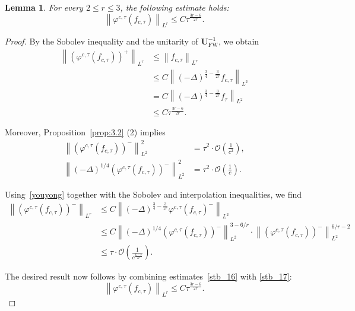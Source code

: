 \documentclass{amsart}
\theoremstyle{plain}
\newtheorem{lemma}[theorem]{Lemma}
\theoremstyle{definition}
\theoremstyle{remark}
\numberwithin{equation}{section} \numberwithin{figure}{section}
\begin{document}
\begin{lemma}\label{unig}
  For every $2 \leq r \leq 3$, the following estimate holds:
  \[
  \left\|\varphi^{c,\tau}(f_{c,\tau})\right\|_{L^r} \leq C \tau^{\frac{3r - 6}{2r}}.
  \]
  \end{lemma}
  
  \begin{proof}
  By the Sobolev inequality and the unitarity of $\mathbf{U}_{\mathrm{FW}}^{-1}$, we obtain
  \begin{equation}\label{stb_16}
  \begin{aligned}
  \left\|\left(\varphi^{c,\tau}(f_{c,\tau})\right)^+\right\|_{L^r} 
  &\leq  \left\|f_{c,\tau}\right\|_{L^r} \\
  &\leq C \left\|(-\Delta)^{\frac{3}{4} - \frac{3}{2r}} f_{c,\tau}\right\|_{L^2} \\
  &= C \left\|(-\Delta)^{\frac{3}{4} - \frac{3}{2r}} f_{\tau}\right\|_{L^2} \\
  &\leq C \tau^{\frac{3r - 6}{2r}}.
  \end{aligned}
  \end{equation}
  
  Moreover, Proposition~\ref{prop:3.2} (2) implies
  \begin{equation}\label{youyong}
  \begin{aligned}
  \left\|\left(\varphi^{c,\tau}(f_{c,\tau})\right)^-\right\|_{L^2}^2 &= \tau^2 \cdot \mathcal{O}\left(\frac{1}{c^2}\right), \\
  \left\|(-\Delta)^{1/4} \left(\varphi^{c,\tau}(f_{c,\tau})\right)^-\right\|_{L^2}^2 &= \tau^2 \cdot \mathcal{O}\left(\frac{1}{c}\right).
  \end{aligned}
  \end{equation}
  
  Using~\eqref{youyong} together with the Sobolev and interpolation inequalities, we find
  \begin{equation}\label{stb_17}
  \begin{aligned}
  \left\|\left(\varphi^{c,\tau}(f_{c,\tau})\right)^-\right\|_{L^r} 
  &\leq C \left\|(-\Delta)^{\frac{3}{4} - \frac{3}{2r}} \varphi^{c,\tau}(f_{c,\tau})^-\right\|_{L^2} \\
  &\leq C \left\|(-\Delta)^{1/4} \left(\varphi^{c,\tau}(f_{c,\tau})\right)^-\right\|_{L^2}^{3 - 6/r} 
  \cdot \left\|\left(\varphi^{c,\tau}(f_{c,\tau})\right)^-\right\|_{L^2}^{6/r - 2} \\
  &\leq \tau \cdot \mathcal{O}\left(\frac{1}{c^{\frac{6 - r}{2r}}}\right).
  \end{aligned}
  \end{equation}
  
  The desired result now follows by combining estimates~\eqref{stb_16} with \eqref{stb_17}:
  \[
  \left\|\varphi^{c,\tau}(f_{c,\tau})\right\|_{L^r} \leq C \tau^{\frac{3r - 6}{2r}}.
  \]
  \end{proof}
\end{document}
